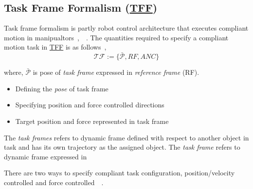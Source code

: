 \subsection{Task Frame Formalism (\hyperref[tff]{TFF})}

Task frame formalism is partly robot control architecture that executes compliant motion in manipualtors~\cite{kroger2004compliant},~\cite{mason1981compliance}~\cite{de1988compliant}. The quantities required to specify a compliant motion task in \hyperref[tff]{TFF} is as follows~\cite{kroger2004compliant},
\begin{equation}\label{eq:tff}
	\mathcal{TF} := \big\{ \bar{\mathcal{P}}, RF, ANC \big\}
\end{equation}

where, $\bar{\mathcal{P}}$ is pose of \textit{task frame} expressed in \textit{reference frame} (RF).
\begin{itemize}
	\item Defining the \textit{pose} of task frame
	\item Specifying position and force controlled directions
	\item Target position and force represented in task frame
\end{itemize}

The \textit{task frames} refers to dynamic frame defined with respect to another object in task and has its own trajectory as the assigned object. The \textit{task frame} refers to dynamic frame expressed in 

There are two ways to specify compliant task configuration, position/velocity controlled and force controlled~\cite{mason1981compliance}~\cite{de1988compliant}.

